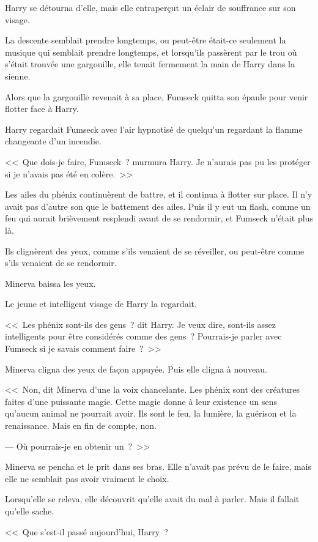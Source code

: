 Harry se détourna d'elle, mais elle entraperçut un éclair de souffrance sur son visage.

La descente semblait prendre longtemps, ou peut-être était-ce seulement la musique qui semblait prendre longtemps, et lorsqu'ils passèrent par le trou où s'était trouvée une gargouille, elle tenait fermement la main de Harry dans la sienne.

Alors que la gargouille revenait à sa place, Fumseck quitta son épaule pour venir flotter face à Harry.

Harry regardait Fumseck avec l'air hypnotisé de quelqu'un regardant la flamme changeante d'un incendie.

<<~Que dois-je faire, Fumseck~? murmura Harry. Je n'aurais pas pu les protéger si je n'avais pas été en colère.~>>

Les ailes du phénix continuèrent de battre, et il continua à flotter sur place. Il n'y avait pas d'autre son que le battement des ailes. Puis il y eut un flash, comme un feu qui aurait brièvement resplendi avant de se rendormir, et Fumseck n'était plus là.

Ils clignèrent des yeux, comme s'ils venaient de se réveiller, ou peut-être comme s'ils venaient de se rendormir.

Minerva baissa les yeux.

Le jeune et intelligent visage de Harry la regardait.

<<~Les phénix sont-ils des gens~? dit Harry. Je veux dire, sont-ils assez intelligents pour être considérés comme des gens~? Pourrais-je parler avec Fumseck si je savais comment faire~?~>>

Minerva cligna des yeux de façon appuyée. Puis elle cligna à nouveau.

<<~Non, dit Minerva d'une la voix chancelante. Les phénix sont des créatures faites d'une puissante magie. Cette magie donne à leur existence un sens qu'aucun animal ne pourrait avoir. Ils sont le feu, la lumière, la guérison et la renaissance. Mais en fin de compte, non.

--- Où pourrais-je en obtenir un~?~>>

Minerva se pencha et le prit dans ses bras. Elle n'avait pas prévu de le faire, mais elle ne semblait pas avoir vraiment le choix.

Lorsqu'elle se releva, elle découvrit qu'elle avait du mal à parler. Mais il fallait qu'elle sache.

<<~Que s'est-il passé aujourd'hui, Harry~?

